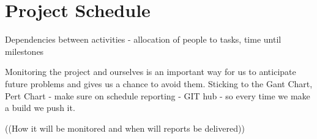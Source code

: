 \documentclass[a4paper,11pt]{article}
\begin{document}
\section{Project Schedule}

Dependencies between activities - allocation of people to tasks, time until milestones

Monitoring the project and ourselves is an important way for us to anticipate future
problems and gives us a chance to avoid them.
Sticking to the Gant Chart, Pert Chart - make sure on schedule
reporting - GIT hub - so every time we make a build we push it.

((How it will be monitored and when will reports be delivered))
\end{document}
